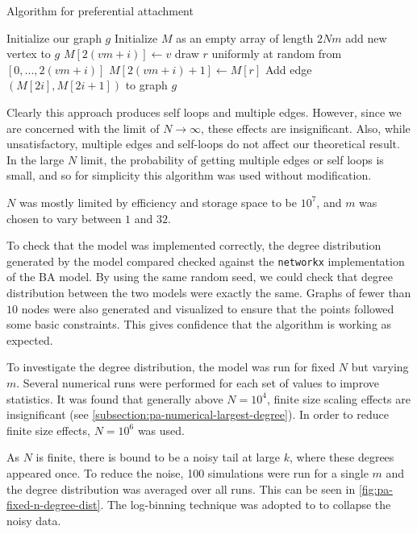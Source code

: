 \begin{algorithm}
\caption{Algorithm for preferential attachment}\label{alg:pa}
\begin{algorithmic}[1]
\State Initialize our graph $g$
\State Initialize $M$ as an empty array of length $2Nm$
	\State add new vertex to $g$
		\State $M[2(vm + i)] \gets v$
		\State draw $r$ uniformly at random 
		\State from $[0, ..., 2(vm + i)]$
		\State $M[2(vm + i)+1] \gets M[r]$ 
	\EndFor
\EndFor
\State
{}
	\State Add edge $(M[2i], M[2i+1])$ to graph $g$
\EndFor
\end{algorithmic}
\end{algorithm}

Clearly this approach produces self loops and multiple edges. However, since we are concerned with the limit of $N \rightarrow \infty$, these effects are insignificant. Also, while unsatisfactory, multiple edges and self-loops do not affect our theoretical result. In the large $N$ limit, the probability of getting multiple edges or self loops is small, and so for simplicity this algorithm was used without modification. 

$N$ was mostly limited by efficiency and storage space to be $10^7$, and $m$ was chosen to vary between $1$ and $32$. 

To check that the model was implemented correctly, the degree distribution generated by the model compared checked against the \texttt{networkx} implementation of the BA model. By using the same random seed, we could check that degree distribution between the two models were exactly the same. Graphs of fewer than $10$ nodes were also generated and visualized to ensure that the points followed some basic constraints. This gives confidence that the algorithm is working as expected. 

To investigate the degree distribution, the model was run for fixed $N$ but varying $m$. Several numerical runs were performed for each set of values to improve statistics. It was found that generally above $N=10^4$, finite size scaling effects are insignificant (see \autoref{subsection:pa-numerical-largest-degree}). In order to reduce finite size effects, $N=10^6$ was used. 

As $N$ is finite, there is bound to be a noisy tail at large $k$, where these degrees appeared once. To reduce the noise, 100 simulations were run for a single $m$ and the degree distribution was averaged over all runs. This can be seen in \autoref{fig:pa-fixed-n-degree-dist}. The log-binning technique \citep{Christensen:2005} was adopted to to collapse the noisy data. 

